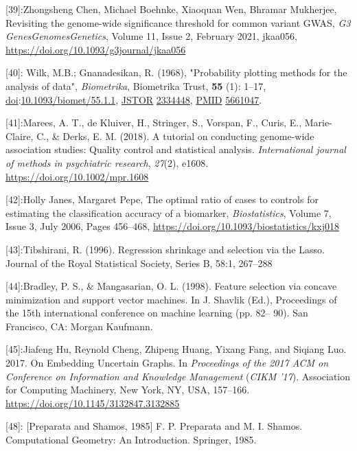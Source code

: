 \documentclass[
]{article}
\begin{document}
{[}39{]}:Zhongsheng Chen, Michael Boehnke, Xiaoquan Wen, Bhramar
Mukherjee, Revisiting the genome-wide significance threshold for common
variant GWAS, \emph{G3 Genes\textbar Genomes\textbar Genetics}, Volume
11, Issue 2, February 2021, jkaa056,
\url{https://doi.org/10.1093/g3journal/jkaa056}

{[}40{]}: Wilk, M.B.; Gnanadesikan, R. (1968), "Probability plotting
methods for the analysis of data", \emph{Biometrika}, Biometrika Trust,
\textbf{55} (1): 1--17,
\href{https://en.wikipedia.org/wiki/Doi_(identifier)}{doi}:\href{https://doi.org/10.1093\%2Fbiomet\%2F55.1.1}{10.1093/biomet/55.1.1},
\href{https://en.wikipedia.org/wiki/JSTOR_(identifier)}{JSTOR}
\href{https://www.jstor.org/stable/2334448}{2334448},
\href{https://en.wikipedia.org/wiki/PMID_(identifier)}{PMID}
\href{https://pubmed.ncbi.nlm.nih.gov/5661047}{5661047}.

{[}41{]}:Marees, A. T., de Kluiver, H., Stringer, S., Vorspan, F.,
Curis, E., Marie-Claire, C., \& Derks, E. M. (2018). A tutorial on
conducting genome-wide association studies: Quality control and
statistical analysis. \emph{International journal of methods in
psychiatric research}, \emph{27}(2), e1608.
\url{https://doi.org/10.1002/mpr.1608}

{[}42{]}:Holly Janes, Margaret Pepe, The optimal ratio of cases to
controls for estimating the classification accuracy of a biomarker,
\emph{Biostatistics}, Volume 7, Issue 3, July 2006, Pages 456--468,
\url{https://doi.org/10.1093/biostatistics/kxj018}

{[}43{]}:Tibshirani, R. (1996). Regression shrinkage and selection via
the Lasso. Journal of the Royal Statistical Society, Series B, 58:1,
267--288

{[}44{]}:Bradley, P. S., \& Mangasarian, O. L. (1998). Feature selection
via concave minimization and support vector machines. In J. Shavlik
(Ed.), Proceedings of the 15th international conference on machine
learning (pp. 82-- 90). San Francisco, CA: Morgan Kaufmann.

{[}45{]}:Jiafeng Hu, Reynold Cheng, Zhipeng Huang, Yixang Fang, and
Siqiang Luo. 2017. On Embedding Uncertain Graphs. In \emph{Proceedings
of the 2017 ACM on Conference on Information and Knowledge Management}
(\emph{CIKM '17}). Association for Computing Machinery, New York, NY,
USA, 157--166. \url{https://doi.org/10.1145/3132847.3132885}

{[}48{]}: {[}Preparata and Shamos, 1985{]} F. P. Preparata and M. I.
Shamos. Computational Geometry: An Introduction. Springer, 1985.
\end{document}
